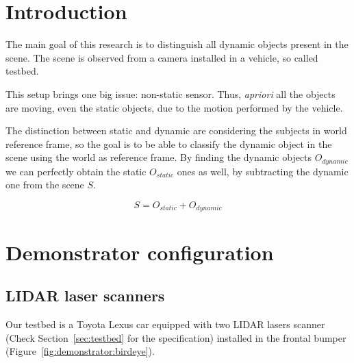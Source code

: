 
\section{Introduction}

The main goal of this research is to distinguish all dynamic objects present in the scene. The scene is observed from a camera installed in a vehicle, so called testbed.

This setup brings one big issue: non-static sensor. Thus, \textit{apriori} all the objects are moving, even the static objects, due to the motion performed by the vehicle.

The distinction between static and dynamic are considering the subjects in world reference frame, so the goal is to be able to classify the dynamic object in the scene using the world as reference frame. By finding the dynamic objects $O_{dynamic}$ we can perfectly obtain the static $O_{static}$ ones as well, by subtracting the dynamic one from the scene $S$.

\begin{equation}
S=O_{static}+O_{dynamic}
\end{equation}

\section{Demonstrator configuration} %
\label{sec:demonstrator}

\subsection{LIDAR laser scanners}

Our testbed is a Toyota Lexus car equipped with two LIDAR lasers scanner (Check Section~\ref{sec:testbed} for the specification) installed in the frontal bumper (Figure~\ref{fig:demonstrator:birdeye}).

